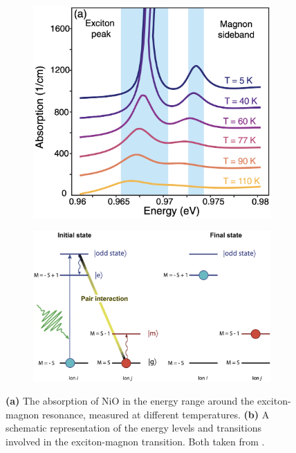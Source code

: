 \begin{figure}[ht]
    \centering
    \begin{subfigure}[b]{0.3\textwidth}
        \includegraphics[width=\textwidth]{pictures/5.png}
        \caption{}
        \label{fig:5}
    \end{subfigure}
    \hspace{1cm}
    \begin{subfigure}[b]{0.6\textwidth}
        \includegraphics[width=\textwidth]{pictures/6.png}
        \caption{}
        \label{fig:6}
    \end{subfigure}
    \caption{\textbf{(a)} The absorption of NiO in the energy range around the exciton-magnon resonance, measured at different temperatures. \textbf{(b)} A schematic representation of the energy levels and transitions involved in the exciton-magnon transition. Both taken from \cite{bossini_ultrafast_2021}.}
\end{figure}
